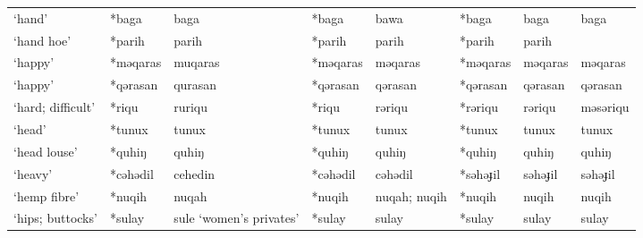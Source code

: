 \begin{landscape}
\begin{longtable}[c]{@{}p{3cm}<{\raggedright}p{2.75cm}<{\raggedright}p{2.75cm}<{\raggedright}p{2.75cm}<{\raggedright}p{2.75cm}<{\raggedright}p{2.75cm}<{\raggedright}p{2.75cm}<{\raggedright}p{2.75cm}<{\raggedright}@{}}
`hand'                                               & *baga              & baga                           & *baga              & bawa                       & *baga            & baga                     & baga                              \\
`hand hoe'                                           & *parih             & parih                          & *parih             & parih                      & *parih           & parih                    &                                   \\
`happy'                                              & *məqaras           & muqaras                        & *məqaras           & məqaras                    & *məqaras         & məqaras                  & məqaras                           \\
`happy'                                              & *qərasan           & qurasan                        & *qərasan           & qərasan                    & *qərasan         & qərasan                  & qərasan                           \\
`hard; difficult'                                    & *riqu              & ruriqu                         & *riqu              & rəriqu                     & *rəriqu          & rəriqu                   & məsəriqu                          \\
`head'                                               & *tunux             & tunux                          & *tunux             & tunux                      & *tunux           & tunux                    & tunux                             \\
`head louse'                                         & *quhiŋ             & quhiŋ                          & *quhiŋ             & quhiŋ                      & *quhiŋ           & quhiŋ                    & quhiŋ                             \\
`heavy'                                              & *cəhədil           & cehedin                        & *cəhədil           & cəhədil                    & *səhəɟil         & səhəɟil                  & səhəɟil                           \\
`hemp fibre'                                         & *nuqih             & nuqah                          & *nuqih             & nuqah; nuqih               & *nuqih           & nuqih                    & nuqih                             \\
`hips; buttocks'                                     & *sulay             & sule `women's privates'        & *sulay             & sulay                      & *sulay           & sulay                    & sulay                             \\

\end{longtable}
\end{landscape}
